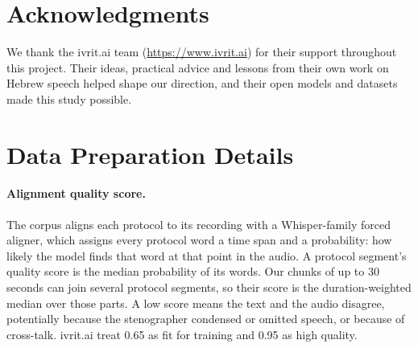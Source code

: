 \documentclass[11pt]{article}
\begin{document}




\section*{Acknowledgments}

We thank the ivrit.ai team (\url{https://www.ivrit.ai})
for their support throughout this project. Their ideas,
practical advice and lessons from their own work on Hebrew speech helped shape
our direction, and their open models and datasets made this study possible.



\appendix
\renewcommand{\topfraction}{0.9}\renewcommand{\bottomfraction}{0.8}
\renewcommand{\textfraction}{0.07}\renewcommand{\floatpagefraction}{0.8}
\renewcommand{\dbltopfraction}{0.9}\renewcommand{\dblfloatpagefraction}{0.8}
\setcounter{topnumber}{3}\setcounter{bottomnumber}{2}\setcounter{totalnumber}{5}\setcounter{dbltopnumber}{2}


\section{Data Preparation Details}
\label{app:data}

\paragraph{Alignment quality score.}
The corpus aligns each protocol to its recording with a Whisper-family forced
aligner, which assigns every protocol word a time span and a probability: how
likely the model finds that word at that point in the audio. A protocol
segment's quality score is the median probability of its words. Our chunks of
up to 30 seconds can join several protocol segments, so their score is the
duration-weighted median over those parts. A low score means the text and the
audio disagree, potentially because the stenographer condensed or omitted
speech, or because of cross-talk. ivrit.ai treat 0.65 as fit for training and
0.95 as high quality.
\end{document}
